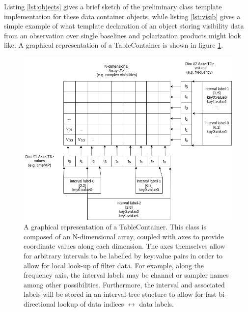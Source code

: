 \documentclass[hidelinks]{article}
\begin{document}
Listing \ref{lst:objects} gives a brief sketch of the preliminary class template implementation for these data container objects, while listing \ref{lst:visib} gives a simple example of what template declaration of an object storing visibility data from an observation over single baselines and polarization products might look like.
A graphical representation of a TableContainer is shown in figure \ref{fig:table-container}.






\begin{figure}[h!]
\begin{center}
  \includegraphics[width=\textwidth]{data-container-baseline.png}
    \caption{A graphical representation of a TableContainer. This class is composed of an N-dimensional array, coupled with axes to provide coordinate values
    along each dimension. The axes themselves allow for arbitrary intervals to be labelled by key:value pairs in order to allow for local look-up of filter data.
    For example, along the frequency axis, the interval labels may be channel or sampler names among other possibilities. Furthermore, the interval and associated
    labels will be stored in an interval-tree stucture to allow for fast bi-directional lookup of data indices $\leftrightarrow$ data labels.}
    \label{fig:table-container}
\end{center}
\end{figure}
\end{document}
